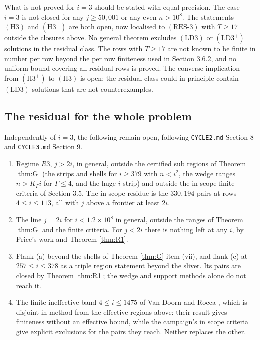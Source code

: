 \documentclass[11pt]{article}
\theoremstyle{remark}
\newcommand{\LDthree}{\ensuremath{\mathrm{(LD3)}}}
\newcommand{\LDthreeplus}{\ensuremath{\mathrm{(LD3^+)}}}
\newcommand{\RESthree}{\ensuremath{\mathrm{(RES\text{-}3)}}}
\begin{document}
What is not proved for $i=3$ should be stated with equal precision. The case $i=3$ is not closed for any $j\ge 50{,}001$ or any even $n>10^8$. The statements $(\mathrm{H3})$ and $(\mathrm{H3^+})$ are both open, now localised to \RESthree{} with $T\ge 17$ outside the closures above. No general theorem excludes \LDthree{} or \LDthreeplus{} solutions in the residual class. The rows with $T\ge 17$ are not known to be finite in number per row beyond the per row finiteness used in Section 3.6.2, and no uniform bound covering all residual rows is proved. The converse implication from $(\mathrm{H3^+})$ to $(\mathrm{H3})$ is open: the residual class could in principle contain \LDthree{} solutions that are not counterexamples.

\subsection{The residual for the whole problem}

Independently of $i=3$, the following remain open, following \texttt{CYCLE2.md} Section 8 and \texttt{CYCLE3.md} Section 9.

\begin{enumerate}[label=(\roman*),leftmargin=2.5em]
\item Regime $R3$, $j>2i$, in general, outside the certified sub regions of Theorem \ref{thm:G} (the strips and shells for $i\ge 379$ with $n<i^2$, the wedge ranges $n>K_\Gamma i$ for $\Gamma\le 4$, and the huge $i$ strip) and outside the in scope finite criteria of Section 3.5. The in scope residue is the $330{,}194$ pairs at rows $4\le i\le 113$, all with $j$ above a frontier at least $2i$.
\item The line $j=2i$ for $i<1.2\times 10^8$ in general, outside the ranges of Theorem \ref{thm:G} and the finite criteria. For $j<2i$ there is nothing left at any $i$, by Price's work and Theorem \ref{thm:R1}.
\item Flank (a) beyond the shells of Theorem \ref{thm:G} item (vii), and flank (c) at $257\le i\le 378$ as a triple region statement beyond the sliver. Its pairs are closed by Theorem \ref{thm:R1}; the wedge and support methods alone do not reach it.
\item The finite ineffective band $4\le i\le 1475$ of Van Doorn and Rocca \cite{VDRpartial}, which is disjoint in method from the effective regions above: their result gives finiteness without an effective bound, while the campaign's in scope criteria give explicit exclusions for the pairs they reach. Neither replaces the other.
\end{enumerate}
\end{document}
